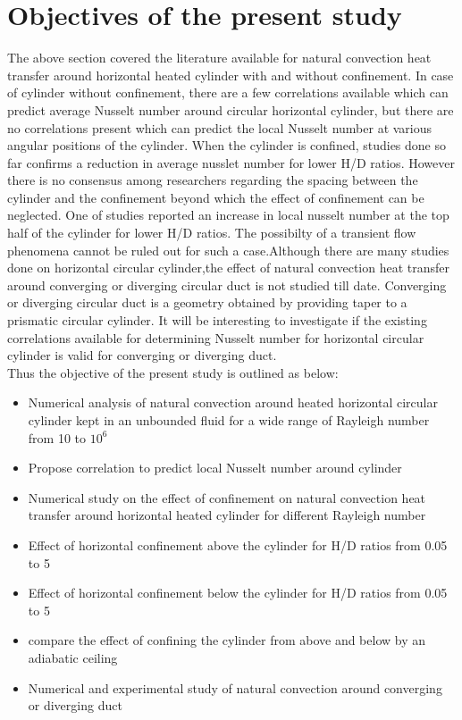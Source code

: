 \section{Objectives of the present study}
The above section covered the literature available for natural convection heat transfer around horizontal heated cylinder with and without confinement. In case of cylinder without confinement, there are a few correlations available which can predict average Nusselt number around circular horizontal cylinder, but there are no correlations present which can predict the local Nusselt number at various angular positions of the cylinder. When the cylinder is confined, studies done so far confirms a reduction in average nusslet number for lower H/D ratios. However there is no consensus among researchers regarding the spacing between the cylinder and the confinement beyond which the effect of confinement can be neglected. One of studies reported an increase in local nusselt number at the top half of the cylinder for lower H/D ratios. The possibilty of a transient flow phenomena cannot be ruled out for such a case.Although there are many studies done on horizontal circular cylinder,the effect of natural convection heat transfer around converging or diverging circular duct is not studied till date. Converging or diverging circular duct is a geometry obtained by providing taper to a prismatic circular cylinder. It will be interesting to investigate if the existing correlations available for determining Nusselt number for horizontal circular cylinder is valid for converging or diverging duct.\\
Thus the objective of the present study is outlined as below:
\begin{itemize}
\item Numerical analysis of natural convection around heated horizontal circular cylinder kept in an unbounded fluid for a wide range of Rayleigh number from 10 to $10^6$ 
\item Propose correlation to predict local Nusselt number around cylinder
\item Numerical study on the effect of confinement on natural convection heat transfer around horizontal heated cylinder for different Rayleigh number
\item  Effect of horizontal confinement above the cylinder for H/D ratios from 0.05 to 5
\item Effect of horizontal confinement below the cylinder for H/D ratios from 0.05 to 5
\item compare the effect of confining the cylinder from above and below by an adiabatic ceiling
\item Numerical and experimental study of natural convection around converging or diverging duct
\end{itemize}

